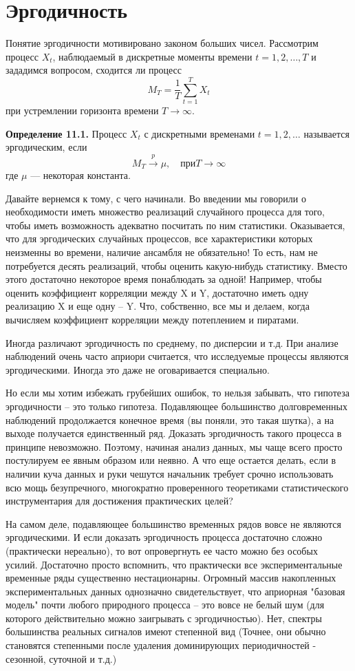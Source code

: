 \section{Эргодичность}
Понятие эргодичности мотивировано законом больших чисел. Рассмотрим процесс
$X_t$, наблюдаемый в дискретные моменты времени $t = 1, 2, \ldots, T$
и зададимся вопросом, сходится ли процесс \[ M_T = \frac{1}{T}
\sum_{t=1}^{T} X_t \] при устремлении горизонта времени $T \to
\infty$.

\textbf{Определение 11.1.} Процесс $X_t$ с дискретными
временами $t = 1, 2, \ldots$ называется эргодическим, если \[ M_T
\xrightarrow{p} \mu, \quad \text{при} T \to \infty \] где $\mu$ —
некоторая константа.

Давайте вернемся к тому, с чего начинали. Во введении мы говорили о
необходимости иметь множество реализаций случайного процесса для
того, чтобы иметь возможность адекватно посчитать по ним статистики.
Оказывается, что для эргодических случайных
процессов, все характеристики которых неизменны во времени, наличие
ансамбля не обязательно! То есть, нам не потребуется десять
реализаций, чтобы оценить какую-нибудь статистику. Вместо этого
достаточно некоторое время понаблюдать за одной! Например, чтобы
оценить коэффициент корреляции между X и Y, достаточно иметь одну
реализацию X и еще одну – Y. Что, собственно, все мы и делаем,
когда вычисляем коэффициент корреляции между потеплением и
пиратами.

Иногда различают эргодичность по среднему, по дисперсии и т.д. При
анализе наблюдений очень часто априори считается, что исследуемые
процессы являются эргодическими. Иногда это даже не оговаривается специально.

Но если мы хотим избежать грубейших ошибок, то нельзя забывать, что
гипотеза эргодичности – это только гипотеза. Подавляющее
большинство долговременных наблюдений продолжается конечное время
(вы поняли, это такая шутка), а на выходе получается единственный
ряд. Доказать эргодичность такого процесса в принципе невозможно.
Поэтому, начиная анализ данных, мы чаще всего просто постулируем ее
явным образом или неявно. А что еще остается делать, если в наличии
куча данных и руки чешутся начальник требует срочно использовать
всю мощь безупречного, многократно проверенного теоретиками
статистического инструментария для достижения практических целей?

На самом деле, подавляющее большинство временных рядов вовсе
не являются эргодическими. И если доказать эргодичность процесса
достаточно сложно (практически нереально), то вот
опровергнуть ее часто можно без особых усилий. Достаточно просто
вспомнить, что практически все экспериментальные временные ряды
существенно нестационарны. Огромный массив накопленных
экспериментальных данных однозначно свидетельствует, что априорная
"базовая модель" почти любого природного процесса – это вовсе не
белый шум (для которого действительно можно заигрывать с
эргодичностью). Нет, спектры большинства реальных сигналов имеют
степенной вид (Точнее, они обычно становятся степенными после
удаления доминирующих периодичностей - сезонной, суточной и т.д.)

